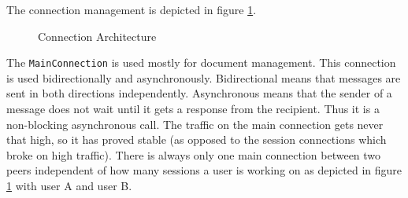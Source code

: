 The connection management is depicted in figure \ref{fig:network.discovery.connection.architecture}.

\begin{figure}[H]
 \centering
 \caption{Connection Architecture}
 \label{fig:network.discovery.connection.architecture}
\end{figure}


The \texttt{MainConnection} is used mostly for document management. This connection is used bidirectionally and asynchronously. Bidirectional means that messages are sent in both directions independently. Asynchronous means that the sender of a message does not wait until it gets a response from the recipient. Thus it is a non-blocking asynchronous call. The traffic on the main connection gets never that high, so it has proved stable (as opposed to the session connections which broke on high traffic). There is always only one main connection between two peers independent of how many sessions a user is working on as depicted in figure \ref{fig:network.discovery.connection.architecture} with user A and user B.

